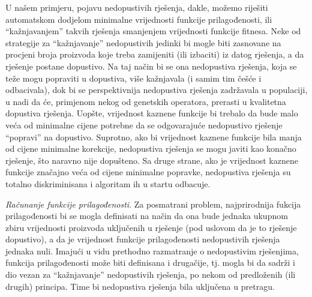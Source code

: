 \documentclass[a4paper, utf8, 11pt, colorlinks]{book}
\begin{document}
U našem primjeru, pojavu nedopustivih rješenja, dakle, možemo riješiti automatskom dodjelom minimalne vrijednosti funkcije prilagođenosti, ili ``kažnjavanjem'' takvih rješenja smanjenjem vrijednosti funkcije fitnesa. Neke od strategije za ``kažnjavanje'' nedopustivih jedinki bi mogle biti zasnovane na procjeni broja proizvoda koje treba zamijeniti (ili izbaciti) iz datog rješenja, a da rješenje postane dopustivo. Na taj način bi se ona nedopustiva rješenja, koja se teže mogu popraviti u dopustiva, više kažnjavala (i samim tim češće i odbacivala), dok bi se perspektivnija nedopustiva rješenja zadržavala u populaciji, u nadi da će, primjenom nekog od genetskih operatora, prerasti u kvalitetna dopustiva rješenja. Uopšte, vrijednost kaznene funkcije bi trebalo da bude malo veća od minimalne cijene potrebne da se odgovarajuće nedopustivo rješenje ``popravi'' na dopustivo. Suprotno, ako bi vrijednost kaznene funkcije bila manja od cijene minimalne korekcije, nedopustiva rješenja se mogu javiti kao konačno rješenje, što naravno nije dopušteno. Sa druge strane, ako je vrijednost kaznene funkcije značajno veća od cijene minimalne popravke, nedopustiva rješenja su totalno diskriminisana i algoritam ih u startu odbacuje. 

\emph{Računanje funkcije prilagođenosti}. Za posmatrani problem, najprirodnija fukcija prilagođenosti bi se mogla definisati na način da ona bude jednaka ukupnom zbiru vrijednosti proizvoda uključenih u rješenje (pod uslovom da je to rješenje dopustivo), a da je vrijednost funkcije prilagođenosti  nedopustivih rješenja   jednaka nuli. 
Imajući u vidu prethodno razmatranje o nedopustivim rješenjima, funkcija prilagođenosti može biti definisana i drugačije, tj. mogla bi da sadrži i dio vezan za  ``kažnjavanje'' nedopustivih rješenja, po nekom od predloženih (ili drugih) principa. Time bi nedopustiva rješenja bila uključena u pretragu.
\end{document}
